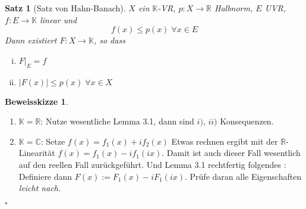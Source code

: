 \documentclass[ngerman]{report}
\theoremstyle{plain}%
\newtheorem{thm}{Satz}[chapter]
\theoremstyle{definition}%
\theoremstyle{myStyle}
\newtheorem*{proof*}{Beweisskizze}
\newenvironment{hinweise}{\footnotesize \begin{proof*}}{\hfill $\square$ \end{proof*}\normalsize}
\newcommand{\C}{\mathbb{C}}
\newcommand{\R}{\mathbb{R}}
\newcommand{\K}{\mathbb{K}}
\begin{document}
	\begin{thm}[Satz von Hahn-Banach]
		$X$ ein $\K$-VR, $p: X \to \R$ Halbnorm, $E$ UVR, $f: E \to \K$ linear und
			$$ f(x) \leq p(x) \; \forall x \in E$$
	Dann existiert $F: X \to \K$, so dass 
		\begin{enumerate}[(i)]
			\item $F|_E = f$
			\item $|F(x)| \leq p(x) \; \forall x \in X$
		\end{enumerate}
	\end{thm}

	\begin{hinweise}
		\begin{enumerate}[{Fall} 1]
			\item $\K = \R$: Nutze wesentliche Lemma 3.1, dann sind $i)$, $ii)$ Konsequenzen.
			\item $\K = \C$: Setze $f(x) = f_1(x) + i f_2(x)$ Etwas rechnen ergibt mit der $\R$-Linearität 
				$f(x) = f_1(x) - i f_1(ix)$. Damit ist auch dieser Fall wesentlich auf den reellen Fall zurückgeführt. Und Lemma 3.1 rechtfertig folgendes :
				Definiere dann $F(x) := F_1(x) - i F_1(ix)$. Prüfe daran alle Eigenschaften \textit{leicht nach}.
		\end{enumerate}
	\end{hinweise}
\end{document}
